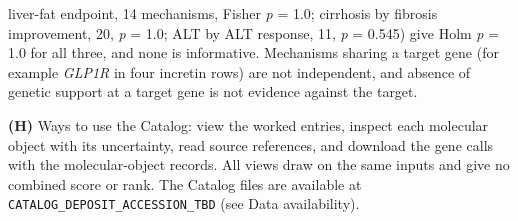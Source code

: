 liver-fat endpoint, 14 mechanisms, Fisher \emph{p} = 1.0; cirrhosis by fibrosis improvement, 20, \emph{p} = 1.0; ALT by ALT response, 11, \emph{p} = 0.545) give Holm \emph{p} = 1.0 for all three, and none is informative. Mechanisms sharing a target gene (for example \emph{GLP1R} in four incretin rows) are not independent, and absence of genetic support at a target gene is not evidence against the target.

\textbf{(H)} Ways to use the Catalog: view the worked entries, inspect each molecular object with its uncertainty, read source references, and download the gene calls with the molecular-object records. All views draw on the same inputs and give no combined score or rank. The Catalog files are available at \texttt{CATALOG\_DEPOSIT\_ACCESSION\_TBD} (see Data availability).
